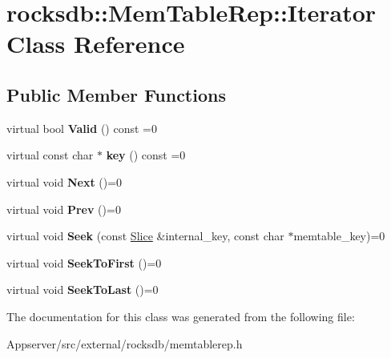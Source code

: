 \hypertarget{classrocksdb_1_1MemTableRep_1_1Iterator}{}\section{rocksdb\+:\+:Mem\+Table\+Rep\+:\+:Iterator Class Reference}
\label{classrocksdb_1_1MemTableRep_1_1Iterator}
\subsection*{Public Member Functions}
\begin{DoxyCompactItemize}
\item 
virtual bool {\bfseries Valid} () const =0\hypertarget{classrocksdb_1_1MemTableRep_1_1Iterator_a9302edb2d05c47f60bbf2d51143b04b8}{}\label{classrocksdb_1_1MemTableRep_1_1Iterator_a9302edb2d05c47f60bbf2d51143b04b8}

\item 
virtual const char $\ast$ {\bfseries key} () const =0\hypertarget{classrocksdb_1_1MemTableRep_1_1Iterator_ad9106ab56efdb228a5e480af28a2a7ab}{}\label{classrocksdb_1_1MemTableRep_1_1Iterator_ad9106ab56efdb228a5e480af28a2a7ab}

\item 
virtual void {\bfseries Next} ()=0\hypertarget{classrocksdb_1_1MemTableRep_1_1Iterator_a1cee574cec97171a50b3a1c1a0c921e8}{}\label{classrocksdb_1_1MemTableRep_1_1Iterator_a1cee574cec97171a50b3a1c1a0c921e8}

\item 
virtual void {\bfseries Prev} ()=0\hypertarget{classrocksdb_1_1MemTableRep_1_1Iterator_a4a4664ef5b32aa7402d647b57bfcc3bb}{}\label{classrocksdb_1_1MemTableRep_1_1Iterator_a4a4664ef5b32aa7402d647b57bfcc3bb}

\item 
virtual void {\bfseries Seek} (const \hyperlink{classrocksdb_1_1Slice}{Slice} \&internal\+\_\+key, const char $\ast$memtable\+\_\+key)=0\hypertarget{classrocksdb_1_1MemTableRep_1_1Iterator_abab5a891f87f0510b427e2878609c29e}{}\label{classrocksdb_1_1MemTableRep_1_1Iterator_abab5a891f87f0510b427e2878609c29e}

\item 
virtual void {\bfseries Seek\+To\+First} ()=0\hypertarget{classrocksdb_1_1MemTableRep_1_1Iterator_ae061a6535f35b5708e3263bb1d5b6821}{}\label{classrocksdb_1_1MemTableRep_1_1Iterator_ae061a6535f35b5708e3263bb1d5b6821}

\item 
virtual void {\bfseries Seek\+To\+Last} ()=0\hypertarget{classrocksdb_1_1MemTableRep_1_1Iterator_a0d0b6c4a54c48ab0c554a79cfd5d1012}{}\label{classrocksdb_1_1MemTableRep_1_1Iterator_a0d0b6c4a54c48ab0c554a79cfd5d1012}

\end{DoxyCompactItemize}


The documentation for this class was generated from the following file\+:\begin{DoxyCompactItemize}
\item 
Appserver/src/external/rocksdb/memtablerep.\+h\end{DoxyCompactItemize}

